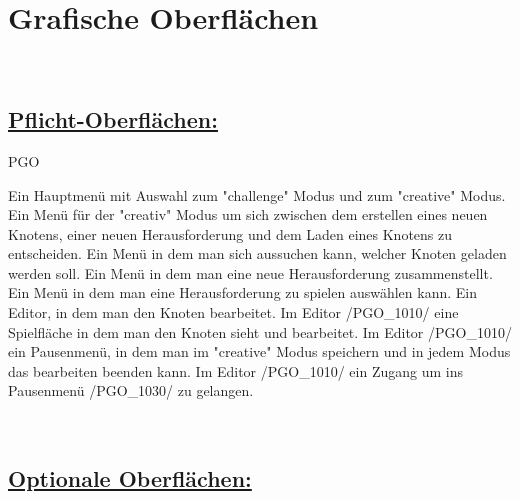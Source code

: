 %
%


%
%
\clearpage


\section{Grafische Oberflächen}
\label{NU:GO}~\\

\subsection*{\underline{Pflicht-Oberflächen:}}

\begin{ids}{\gls{PGO}}

	\id[0010] Ein Hauptmenü mit Auswahl zum "challenge" Modus und zum "creative" Modus.
	\id[0020] Ein Menü für der "creativ" Modus um sich zwischen dem erstellen eines neuen Knotens, einer neuen Herausforderung und dem Laden eines Knotens zu entscheiden.
	\id[0030] Ein Menü in dem man sich aussuchen kann, welcher Knoten geladen werden soll.
	\id[0040] Ein Menü in dem man eine neue Herausforderung zusammenstellt.
	\id[0050] Ein Menü in dem man eine Herausforderung zu spielen auswählen kann.
	\id[1010] Ein Editor, in dem man den Knoten bearbeitet.
	\id[1020] Im Editor /PGO\_1010/ eine Spielfläche in dem man den Knoten sieht und bearbeitet.
	\id[1030] Im Editor /PGO\_1010/ ein Pausenmenü, in dem man im "creative" Modus speichern und in jedem Modus das bearbeiten beenden kann.
	\id[1040] Im Editor /PGO\_1010/ ein Zugang um ins Pausenmenü /PGO\_1030/ zu gelangen.

\end{ids}


~\\


\subsection*{\underline{Optionale Oberflächen:}}

